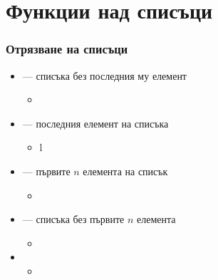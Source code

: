 \documentclass{beamer}
\begin{document}
\section{Функции над списъци}

\begin{frame}
  \frametitle{Отрязване на списъци}

  \begin{itemize}[<+->]
  \item {} --- списъка без последния му елемент
    \begin{itemize}[<.->]
    \item {}
    \end{itemize}
  \item {} --- последния елемент на списъка
    \begin{itemize}[<.->]
    \item {}l
    \end{itemize}
  \item {} --- първите $n$ елемента на списък
    \begin{itemize}[<.->]
    \item {}
    \end{itemize}
  \item {} --- списъка без първите $n$ елемента
    \begin{itemize}[<.->]
    \item {}
    \end{itemize}
  \item {}
    \begin{itemize}[<.->]
    \item {}
    \end{itemize}
  \end{itemize}
\end{frame}
\end{document}
